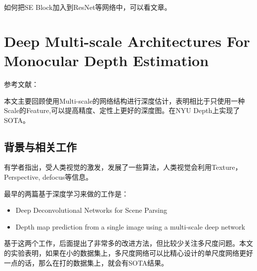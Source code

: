 如何把SE Block加入到ResNet等网络中，可以看文章。

\section{Deep Multi-scale Architectures For Monocular Depth Estimation}

参考文献：

本文主要回顾使用Multi-scale的网络结构进行深度估计，表明相比于只使用一种Scale的Feature,可以提高精度、定性上更好的深度图。在NYU Depth上实现了SOTA。

\subsection{背景与相关工作}

有学者指出，受人类视觉的激发，发展了一些算法，人类视觉会利用Texture， Perspective, defocus等信息。

最早的两篇基于深度学习来做的工作是：

\begin{itemize}
\item Deep Deconvolutional Networks for Scene Parsing
\item Depth map prediction from a single image using a multi-scale deep network
\end{itemize}

基于这两个工作，后面提出了非常多的改进方法，但比较少关注多尺度问题。本文的实验表明，如果在小的数据集上，多尺度网络可以比精心设计的单尺度网络更好一点的话，那么在打的数据集上，就会有SOTA结果。

